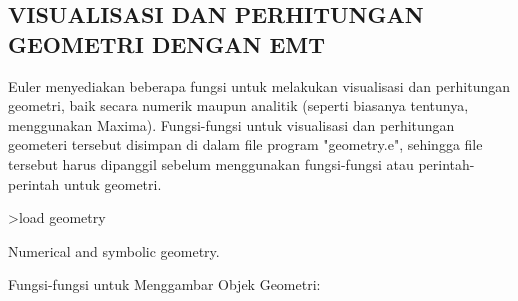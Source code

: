\documentclass[12pt,arial,letterpaper]{book}
\begin{document}
\begin{eulercomment}
\begin{eulercomment}
\begin{eulercomment}
\begin{eulercomment}
\begin{eulercomment}
\begin{eulercomment}
\begin{eulercomment}
\begin{eulercomment}
\begin{eulercomment}
\begin{eulercomment}
\begin{eulercomment}
\begin{eulercomment}
\begin{eulercomment}
\begin{eulercomment}
\begin{eulercomment}
\begin{eulercomment}
\begin{eulercomment}
\begin{eulercomment}
\begin{eulercomment}
\begin{eulercomment}
\begin{eulercomment}
\begin{eulercomment}
\begin{eulercomment}
\begin{eulercomment}
\chapter{VISUALISASI DAN PERHITUNGAN GEOMETRI DENGAN EMT}
\begin{eulercomment}
Euler menyediakan beberapa fungsi untuk melakukan visualisasi dan
perhitungan geometri, baik secara numerik maupun analitik (seperti
biasanya tentunya, menggunakan Maxima). Fungsi-fungsi untuk
visualisasi dan perhitungan geometeri tersebut disimpan di dalam file
program "geometry.e", sehingga file tersebut harus dipanggil sebelum
menggunakan fungsi-fungsi atau perintah-perintah untuk geometri.
\end{eulercomment}
\begin{eulerprompt}
>load geometry
\end{eulerprompt}
\begin{euleroutput}
  Numerical and symbolic geometry.
\end{euleroutput}
\begin{eulercomment}
Fungsi-fungsi untuk Menggambar Objek Geometri:


\end{eulercomment}
\end{eulercomment}
\end{eulercomment}
\end{eulercomment}
\end{eulercomment}
\end{eulercomment}
\end{eulercomment}
\end{eulercomment}
\end{eulercomment}
\end{eulercomment}
\end{eulercomment}
\end{eulercomment}
\end{eulercomment}
\end{eulercomment}
\end{eulercomment}
\end{eulercomment}
\end{eulercomment}
\end{eulercomment}
\end{eulercomment}
\end{eulercomment}
\end{eulercomment}
\end{eulercomment}
\end{eulercomment}
\end{eulercomment}
\end{eulercomment}
\end{document}
